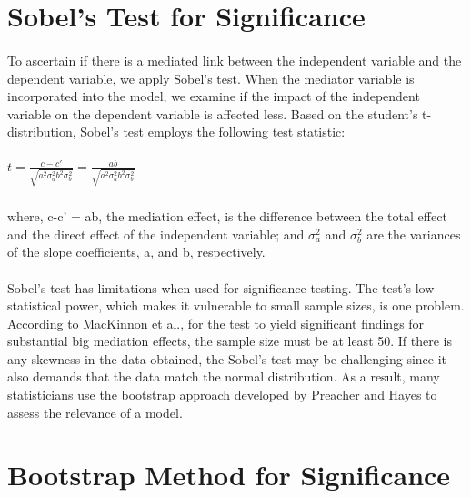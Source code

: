\documentclass[12pt]{report}
\begin{document}
\section*{Sobel's Test for Significance}

\paragraph{}

To ascertain if there is a mediated link between the independent variable and the dependent variable, we apply Sobel's test. When the mediator variable is incorporated into the model, we examine if the impact of the independent variable on the dependent variable is affected less. Based on the student's t-distribution, Sobel's test employs the following test statistic:
\paragraph{}
\smallskip
\LARGE\centering\begin{math}t = \frac{c - c'}{\sqrt{a^2\sigma_a^2b^2\sigma^2_b}} = \frac{ab}{\sqrt{a^2\sigma_a^2b^2\sigma^2_b}}\end{math}
\subparagraph{}
\normalsize
\raggedright
where, c-c’ = ab, the mediation effect, is the difference between the total effect and the direct effect of the independent variable; and \begin{math}\sigma_a^2\end{math} and \begin{math}\sigma_b^2\end{math} are the variances of the slope coefficients, a, and b, respectively. 

\paragraph{}

Sobel's test has limitations when used for significance testing. The test's low statistical power, which makes it vulnerable to small sample sizes, is one problem. According to MacKinnon et al., for the test to yield significant findings for substantial big mediation effects, the sample size must be at least 50. If there is any skewness in the data obtained, the Sobel's test may be challenging since it also demands that the data match the normal distribution. As a result, many statisticians use the bootstrap approach developed by Preacher and Hayes to assess the relevance of a model.
\section*{Bootstrap Method for Significance}
\end{document}
